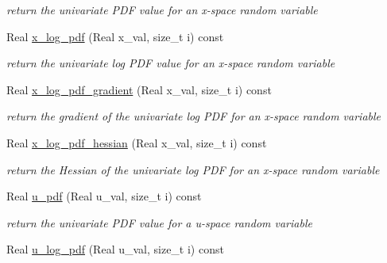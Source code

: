 \begin{DoxyCompactItemize}
\begin{DoxyCompactList}\small\item\em return the univariate P\+DF value for an x-\/space random variable \end{DoxyCompactList}\item 
Real \hyperlink{classPecos_1_1ProbabilityTransformation_a18c181b899e7bf41178b157c64238077}{x\+\_\+log\+\_\+pdf} (Real x\+\_\+val, size\+\_\+t i) const \label{classPecos_1_1ProbabilityTransformation_a18c181b899e7bf41178b157c64238077}

\begin{DoxyCompactList}\small\item\em return the univariate log P\+DF value for an x-\/space random variable \end{DoxyCompactList}\item 
Real \hyperlink{classPecos_1_1ProbabilityTransformation_aa01e5ef43493cc33572bfb8fe8dc3a1d}{x\+\_\+log\+\_\+pdf\+\_\+gradient} (Real x\+\_\+val, size\+\_\+t i) const \label{classPecos_1_1ProbabilityTransformation_aa01e5ef43493cc33572bfb8fe8dc3a1d}

\begin{DoxyCompactList}\small\item\em return the gradient of the univariate log P\+DF for an x-\/space random variable \end{DoxyCompactList}\item 
Real \hyperlink{classPecos_1_1ProbabilityTransformation_a978d18d6a4a2c981d880dfd9a642070a}{x\+\_\+log\+\_\+pdf\+\_\+hessian} (Real x\+\_\+val, size\+\_\+t i) const \label{classPecos_1_1ProbabilityTransformation_a978d18d6a4a2c981d880dfd9a642070a}

\begin{DoxyCompactList}\small\item\em return the Hessian of the univariate log P\+DF for an x-\/space random variable \end{DoxyCompactList}\item 
Real \hyperlink{classPecos_1_1ProbabilityTransformation_a7ce373822b86a427c6aa7e9f62b59270}{u\+\_\+pdf} (Real u\+\_\+val, size\+\_\+t i) const \label{classPecos_1_1ProbabilityTransformation_a7ce373822b86a427c6aa7e9f62b59270}

\begin{DoxyCompactList}\small\item\em return the univariate P\+DF value for a u-\/space random variable \end{DoxyCompactList}\item 
Real \hyperlink{classPecos_1_1ProbabilityTransformation_ad4466edb4dbc579e72646962c75d8d12}{u\+\_\+log\+\_\+pdf} (Real u\+\_\+val, size\+\_\+t i) const \label{classPecos_1_1ProbabilityTransformation_ad4466edb4dbc579e72646962c75d8d12}


\end{DoxyCompactItemize}
